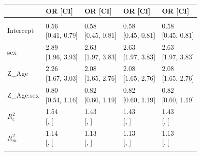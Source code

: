 \documentclass[]{article}
\begin{document}
\begin{table}[H]
\centering
\begin{tabular}{lllll}
\toprule
 & OR [CI] & OR [CI] & OR [CI] & OR [CI]\\
\midrule
\addlinespace[0.3em]
\multicolumn{5}{l}{\textbf{Fixed}}\\
\hspace{1em}Intercept & \makecell{0.56 \\ {[0.41, 0.79]}} & \makecell{0.58 \\ {[0.45, 0.81]}} & \makecell{0.58 \\ {[0.45, 0.81]}} & \makecell{0.58 \\ {[0.45, 0.81]}}\\
\hspace{1em}sex & \makecell{2.89 \\ {[1.96, 3.93]}} & \makecell{2.63 \\ {[1.97, 3.83]}} & \makecell{2.63 \\ {[1.97, 3.83]}} & \makecell{2.63 \\ {[1.97, 3.83]}}\\
\hspace{1em}Z\_Age & \makecell{2.26 \\ {[1.67, 3.03]}} & \makecell{2.08 \\ {[1.65, 2.76]}} & \makecell{2.08 \\ {[1.65, 2.76]}} & \makecell{2.08 \\ {[1.65, 2.76]}}\\
\hspace{1em}Z\_Age:sex & \makecell{0.80 \\ {[0.54, 1.16]}} & \makecell{0.82 \\ {[0.60, 1.19]}} & \makecell{0.82 \\ {[0.60, 1.19]}} & \makecell{0.82 \\ {[0.60, 1.19]}}\\
$R^2_c$ & \makecell{1.54 \\ {[, ]}} & \makecell{1.43 \\ {[, ]}} & \makecell{1.43 \\ {[, ]}} & \makecell{1.43 \\ {[, ]}}\\
$R^2_m$ & \makecell{1.14 \\ {[, ]}} & \makecell{1.13 \\ {[, ]}} & \makecell{1.13 \\ {[, ]}} & \makecell{1.13 \\ {[, ]}}\\
\addlinespace[0.3em]

\end{tabular}
\end{table}
\end{document}
